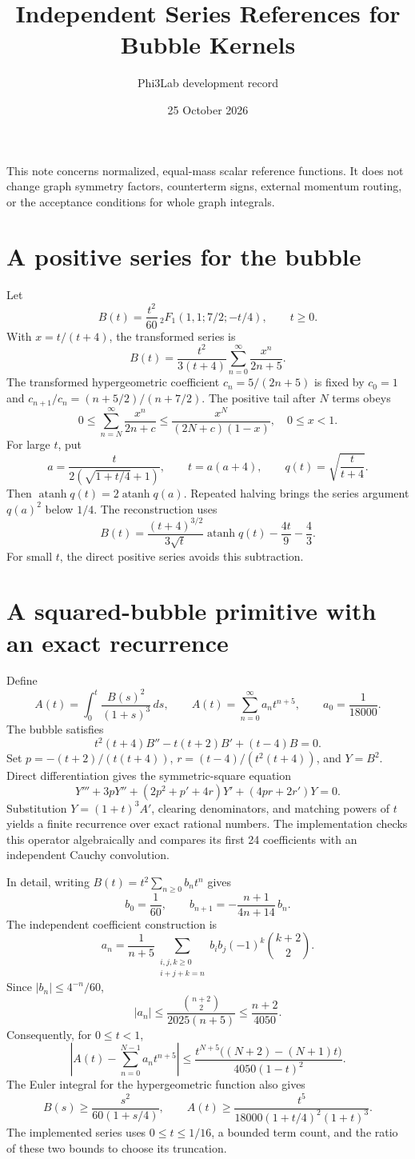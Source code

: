 \documentclass[11pt]{article}
\title{Independent Series References for Bubble Kernels}
\author{Phi3Lab development record}
\date{25 October 2026}
\begin{document}
\maketitle
\noindent This note concerns normalized, equal-mass scalar reference functions.
It does not change graph symmetry factors, counterterm signs, external momentum
routing, or the acceptance conditions for whole graph integrals.
\section{A positive series for the bubble}
Let
\[
 B(t)=\frac{t^2}{60}\,{}_2F_1(1,1;7/2;-t/4),\qquad t\geq0 .
\]
With \(x=t/(t+4)\), the transformed series is
\[
 B(t)=\frac{t^2}{3(t+4)}
       \sum_{n=0}^{\infty}\frac{x^n}{2n+5}.
\]
The transformed hypergeometric coefficient \(c_n=5/(2n+5)\) is fixed
by \(c_0=1\) and
\(c_{n+1}/c_n=(n+5/2)/(n+7/2)\).
The positive tail after \(N\) terms obeys
\[
 0\leq \sum_{n=N}^{\infty}\frac{x^n}{2n+c}
 \leq \frac{x^N}{(2N+c)(1-x)},\quad 0\leq x<1 .
\]
For large \(t\), put
\[
 a=\frac{t}{2(\sqrt{1+t/4}+1)},\qquad
 t=a(a+4),\qquad q(t)=\sqrt{\frac{t}{t+4}}.
\]
Then
\(\operatorname{atanh}q(t)=2\operatorname{atanh}q(a)\).
Repeated halving brings the series argument \(q(a)^2\) below \(1/4\).
The reconstruction uses
\[
 B(t)=\frac{(t+4)^{3/2}}{3\sqrt t}\operatorname{atanh}q(t)
      -\frac{4t}{9}-\frac43.
\]
For small \(t\), the direct positive series avoids this subtraction.

\section{A squared-bubble primitive with an exact recurrence}
Define
\[
 A(t)=\int_0^t\frac{B(s)^2}{(1+s)^3}\,ds,\qquad
 A(t)=\sum_{n=0}^{\infty}a_n t^{n+5},\qquad a_0=\frac1{18000}.
\]
The bubble satisfies
\[
 t^2(t+4)B''-t(t+2)B'+(t-4)B=0.
\]
Set \(p=-(t+2)/(t(t+4))\), \(r=(t-4)/(t^2(t+4))\), and \(Y=B^2\).
Direct differentiation gives the symmetric-square equation
\[
 Y'''+3pY''+(2p^2+p'+4r)Y'+(4pr+2r')Y=0.
\]
Substitution \(Y=(1+t)^3 A'\), clearing denominators, and matching
powers of \(t\) yields a finite recurrence over exact rational numbers.
The implementation checks this operator algebraically and compares its
first 24 coefficients with an independent Cauchy convolution.

In detail, writing \(B(t)=t^2\sum_{n\geq0}b_n t^n\) gives
\[
 b_0=\frac1{60},\qquad
 b_{n+1}=-\frac{n+1}{4n+14}\,b_n.
\]
The independent coefficient construction is
\[
 a_n=\frac1{n+5}
 \sum_{\substack{i,j,k\geq0\\i+j+k=n}}
 b_i b_j(-1)^k\binom{k+2}{2}.
\]
Since \(\lvert b_n\rvert\leq 4^{-n}/60\),
\[
 |a_n|\leq\frac{\binom{n+2}{2}}{2025(n+5)}
          \leq\frac{n+2}{4050}.
\]
Consequently, for \(0\leq t<1\),
\[
 \left|A(t)-\sum_{n=0}^{N-1}a_n t^{n+5}\right|
 \leq
 \frac{t^{N+5}\bigl((N+2)-(N+1)t\bigr)}
      {4050(1-t)^2}.
\]
The Euler integral for the hypergeometric function also gives
\[
 B(s)\geq\frac{s^2}{60(1+s/4)},\qquad
 A(t)\geq\frac{t^5}{18000(1+t/4)^2(1+t)^3}.
\]
The implemented series uses \(0\leq t\leq1/16\), a bounded term count,
and the ratio of these two bounds to choose its truncation.
\end{document}
